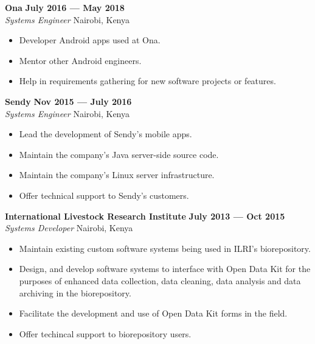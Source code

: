 \documentclass{res}
\begin{document}
\begin{resume}
	\vspace{8pt}
	\textbf{Ona} \hfill        \textbf{July 2016 --- May 2018} \\
	\emph{Systems Engineer}       \hfill  Nairobi, Kenya
	\begin{itemize} \itemsep -2pt %
		\item Developer Android apps used at Ona.
		\item Mentor other Android engineers.
		\item Help in requirements gathering for new software projects or features.
	\end{itemize} \vspace{-4pt}

	\vspace{8pt}
	\textbf{Sendy} \hfill        \textbf{Nov 2015 --- July 2016} \\
	\emph{Systems Engineer}       \hfill Nairobi, Kenya
	\begin{itemize} \itemsep -2pt %
		\item Lead the development of Sendy’s mobile apps.
		\item Maintain the company’s Java server-side source code.
		\item Maintain the company’s Linux server infrastructure.
		\item Offer technical support to Sendy’s customers.
	\end{itemize} \vspace{-4pt}

	\textbf{International Livestock Research Institute} \hfill        \textbf{July 2013 --- Oct 2015} \\
	\emph{Systems Developer}       \hfill   Nairobi, Kenya
	\begin{itemize} \itemsep -2pt %
		\item Maintain existing custom software systems being used in ILRI’s biorepository.
		\item Design, and develop software systems to interface with Open Data Kit for the purposes of enhanced data collection, data cleaning, data analysis and data archiving in the biorepository.
		\item Facilitate the development and use of Open Data Kit forms in the field.
		\item Offer techincal support to biorepository users.
	\end{itemize} \vspace{-4pt}


\end{resume}
\end{document}
